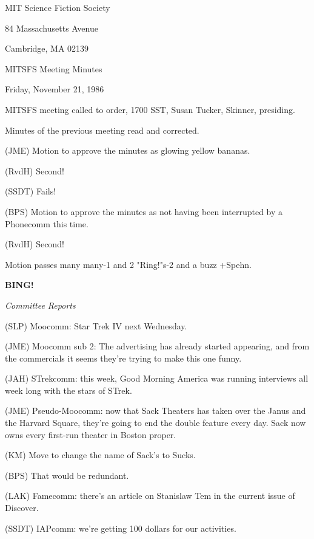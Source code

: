 \documentclass[12pt]{article}
\newcommand{\bing}{{\bf BING!} }
\newcommand{\goto}[1]{\bing \vskip 12pt \centerline{{\em{#1}}}}
\begin{document}
\begin{center}

MIT Science Fiction Society 

84 Massachusetts Avenue

Cambridge, MA 02139

\vspace{12pt}

MITSFS Meeting Minutes 

Friday, November 21, 1986

\end{center}
 
\vspace{18pt}

\setlength{\parskip}{6pt}

\noindent
MITSFS meeting called to order, 1700 SST,
Susan Tucker, Skinner, presiding.

Minutes of the previous meeting read and corrected.

(JME) Motion to approve the minutes as glowing yellow bananas.

(RvdH) Second!

(SSDT) Fails!

(BPS) Motion to approve the minutes as not having been interrupted by a Phonecomm this time.

(RvdH) Second!

Motion passes many many-1 and 2 "Ring!"s-2 and a buzz +Spehn.

\goto{Committee Reports}

(SLP) Moocomm: Star Trek IV next Wednesday.

(JME) Moocomm sub 2: The advertising has already started appearing, and from the commercials it seems they're trying to make this one funny.

(JAH) STrekcomm: this week, Good Morning America was running interviews all week long with the stars of STrek.

(JME) Pseudo-Moocomm: now that Sack Theaters has taken over the Janus and the Harvard Square, they're going to end the double feature every day. Sack now owns every first-run theater in Boston proper.

(KM) Move to change the name of Sack's to Sucks.

(BPS) That would be redundant.

(LAK) Famecomm: there's an article on Stanislaw Tem in the current issue of Discover.

(SSDT) IAPcomm: we're getting 100 dollars for our activities.
\end{document}
